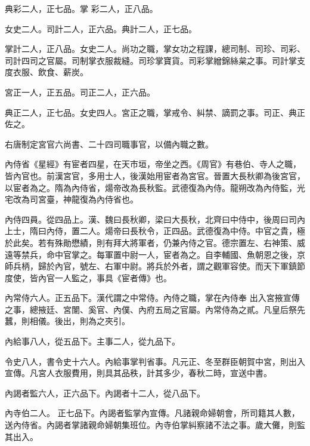 \begin{pinyinscope}
 典彩二人，正七品。掌
 彩二人，正八品。



 女史二人。司計二人，正六品。典計二人，正七品。



 掌計二人，正八品。女史二人。尚功之職，掌女功之程課，總司制、司珍、司彩、司計四司之官屬。司制掌衣服裁縫。司珍掌寶貨。司彩掌繒錦絲枲之事。司計掌支度衣服、飲食、薪炭。



 宮正一人，正五品。司正二人，正六品。



 典正二人，正七品。女史四人。宮正之職，掌戒令、糾禁、謫罰之事。司正、典正佐之。



 右唐制定宮官六尚書、二十四司職事官，以備內職之數。



 內侍省《星經》有宦者四星，在天市垣，帝坐之西。《周官》有巷伯、寺人之職，皆內官也。前漢宮官，多用士人，後漢始用宦者為宮官。晉置大長秋卿為後宮官，以宦者為之。隋為內侍省，煬帝改為長秋監。武德復為內侍。龍朔改為內侍監，光宅改為司宮臺，神龍復為內侍省也。



 內侍四員。從四品上。漢、魏曰長秋卿，梁曰大長秋，北齊曰中侍中，後周曰司內上士，隋曰內侍，置二人。煬帝曰長秋令，正四品。武德復為中侍。中官之貴，極於此矣。若有殊勛懋績，則有拜大將軍者，仍兼內侍之官。德宗置左、右神策、威遠等禁兵，命中官掌之。每軍置中尉一人，宦者為之。自李輔國、魚朝恩之後，京師兵柄，歸於內官，號左、右軍中尉。將兵於外者，謂之觀軍容使。而天下軍鎮節度使，皆內官一人監之，事具《宦者傳》也。



 內常侍六人。正五品下。漢代謂之中常侍。內侍之職，掌在內侍奉
 出入宮掖宣傳之事，總掖廷、宮闈、奚官、內僕、內府五局之官屬。內常侍為之貳。凡皇后祭先蠶，則相儀。後出，則為之夾引。



 內給事八人，從五品下。主事二人，從九品下。



 令史八人，書令史十六人。內給事掌判省事。凡元正、冬至群臣朝賀中宮，則出入宣傳。凡宮人衣服費用，則具其品秩，計其多少，春秋二時，宣送中書。



 內謁者監六人，正六品下。內謁者十二人，從八品下。



 內寺伯二人。
 正七品下。內謁者監掌內宣傳。凡諸親命婦朝會，所司籍其人數，送內侍省。內謁者掌諸親命婦朝集班位。內寺伯掌糾察諸不法之事。歲大儺，則監其出入。




\end{pinyinscope}
